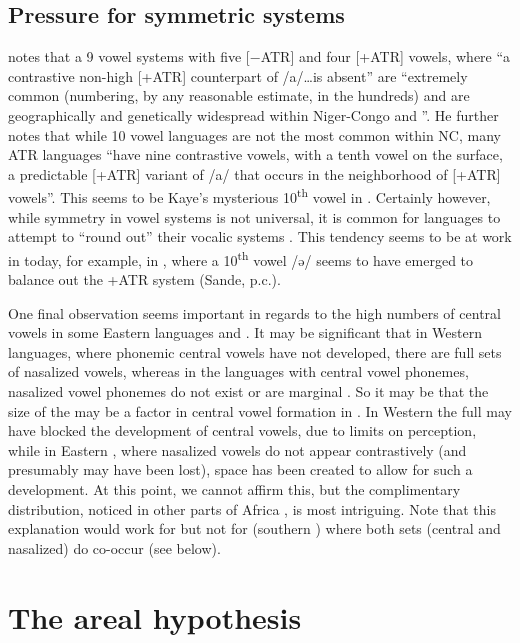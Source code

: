 \documentclass[output=paper,newtxmath,modfonts,nonflat,draft]{langsci/langscibook}
\begin{document}
\subsection{Pressure for symmetric systems}\label{sec:zogbo:4.4} 

\citet[501, 502]{Casali2008} notes that a 9 vowel systems with five [$-$ATR] and four [+ATR] vowels, where “a contrastive non-high [+ATR] counterpart of /a/…is absent” are “extremely common (numbering, by any reasonable estimate, in the hundreds) and are geographically and genetically widespread within Niger-Congo and ”. He further notes that while 10 vowel languages are not the most common within NC, many ATR languages “have nine contrastive vowels, with a tenth vowel on the surface, a predictable [+ATR] variant of /a/ that occurs in the neighborhood of [+ATR] vowels”.  This seems to be Kaye’s mysterious 10\textsuperscript{th} vowel in .  Certainly however, while symmetry in vowel systems is not universal, it is common for languages to attempt to “round out” their vocalic systems \citep[21]{Welmers1973}. This tendency seems to be at work in  today, for example, in , where a 10\textsuperscript{th} vowel /ə/ seems to have emerged to balance out the +ATR  system (Sande, p.c.). 

One final observation seems important in regards to the high numbers of central vowels in some Eastern  languages and .  It may be significant that in Western languages, where phonemic central vowels have not developed, there are full sets of nasalized vowels, whereas in the languages with central vowel phonemes, nasalized vowel phonemes do not exist or are marginal \citep{Marchese1979/1983}.  So it may be that the size of the  may be a factor in central vowel formation in . In Western  the full  may have blocked the development of central vowels, due to limits on perception, while in Eastern , where nasalized vowels do not appear contrastively (and presumably may have been lost), space has been created to allow for such a development.  At this point, we cannot affirm this, but the complimentary distribution, noticed in other parts of Africa \citep{Rolle2013}, is most intriguing. Note that this explanation would work for  but not for  (southern ) where both sets (central and nasalized) do co-occur (see below).

\section{The areal hypothesis}\label{sec:zogbo:5} 
\end{document}

